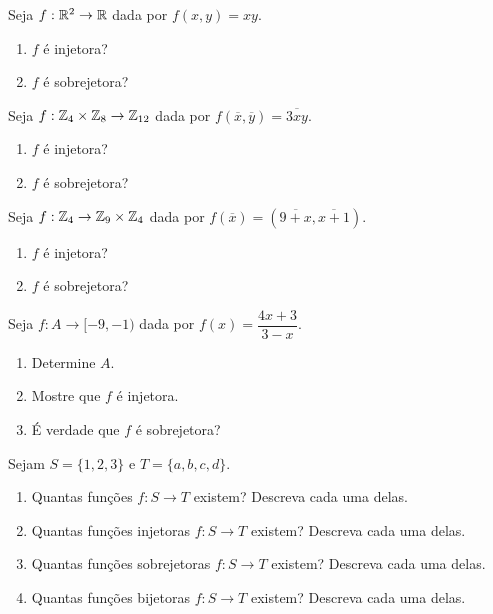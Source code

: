 \documentclass[12pt]{exam}
\begin{document}
\vspace{.6cm}

\questao{} Seja $f: \mathbb{R}^2 \to \mathbb{R}$ dada por $f(x,y) = xy$.
\begin{enumerate}[label={\alph*})]
    \item $f$ é injetora?

    \item $f$ é sobrejetora?
\end{enumerate}

\vspace{.3cm}

\questao{} Seja $f: \mathbb{Z}_4 \times \mathbb{Z}_8 \to \mathbb{Z}_{12}$ dada por $f(\overline{x},\overline{y}) = \overline{3xy}$.
\begin{enumerate}[label={\alph*})]
    \item $f$ é injetora?

    \item $f$ é sobrejetora?
\end{enumerate}

\vspace{.3cm}

\questao{} Seja $f: \mathbb{Z}_4 \to \mathbb{Z}_9 \times \mathbb{Z}_4$ dada por $f(\overline{x}) = (\overline{9 + x},\overline{x+1})$.
\begin{enumerate}[label={\alph*})]
    \item $f$ é injetora?

    \item $f$ é sobrejetora?
\end{enumerate}

\vspace{.3cm}

\questao{} Seja $f : A \to [-9,-1)$ dada por $f(x) = \dfrac{4x + 3}{3 - x}$.
\begin{enumerate}[label={\alph*})]
    \item Determine $A$.

    \item Mostre que $f$ é injetora.

    \item É verdade que $f$ é sobrejetora?
\end{enumerate}

\vspace{.3cm}

\questao{} Sejam $S = \{1, 2, 3\}$ e $T = \{a, b, c, d\}$.
\begin{enumerate}[label={\alph*})]
    \item Quantas funções $f : S \to T$ existem? Descreva cada uma delas.

    \item Quantas funções injetoras $f : S \to T$ existem? Descreva cada uma delas.

    \item Quantas funções sobrejetoras $f : S \to T$ existem? Descreva cada uma delas.

    \item Quantas funções bijetoras $f : S \to T$ existem? Descreva cada uma delas.
\end{enumerate}
\end{document}

